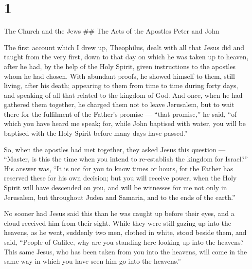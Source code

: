 \hypertarget{section}{%
\section{1}\label{section}}

The Church and the Jews \#\# The Acts of the Apostles Peter and John

 The first account which I drew up, Theophilus, dealt with
all that Jesus did and taught from the very first,  down to
that day on which he was taken up to heaven, after he had, by the help
of the Holy Spirit, given instructions to the apostles whom he had
chosen.  With abundant proofs, he showed himself to them,
still living, after his death; appearing to them from time to time
during forty days, and speaking of all that related to the kingdom of
God.  And once, when he had gathered them together, he
charged them not to leave Jerusalem, but to wait there for the
fulfilment of the Father's promise --- ``that promise,'' he said, ``of
which you have heard me speak;  for, while John baptised
with water, you will be baptised with the Holy Spirit before many days
have passed.''

 So, when the apostles had met together, they asked Jesus
this question --- ``Master, is this the time when you intend to
re-establish the kingdom for Israel?''  His answer was, ``It
is not for you to know times or hours, for the Father has reserved these
for his own decision;  but you will receive power, when the
Holy Spirit will have descended on you, and will be witnesses for me not
only in Jerusalem, but throughout Judea and Samaria, and to the ends of
the earth.''

 No sooner had Jesus said this than he was caught up before
their eyes, and a cloud received him from their sight. 
While they were still gazing up into the heavens, as he went, suddenly
two men, clothed in white, stood beside them,  and said,
``People of Galilee, why are you standing here looking up into the
heavens? This same Jesus, who has been taken from you into the heavens,
will come in the same way in which you have seen him go into the
heavens.''


